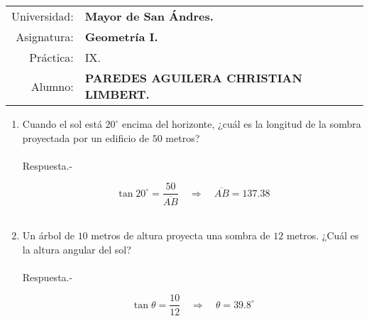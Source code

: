 \documentclass[10pt]{article}
\begin{document}
\begin{tabular}{r l }
Universidad: & \textbf{Mayor de San Ándres.}\\
Asignatura: & \textbf{Geometría I.}\\
 Práctica: & IX.\\ Alumno: & \textbf{PAREDES AGUILERA CHRISTIAN LIMBERT.}
\end{tabular}
\begin{flushleft}
\end{flushleft}


\begin{enumerate}

\section*{Funciones trigonométricas}

\item Cuando el sol está $20^\circ$ encima del horizonte, ¿cuál es la longitud de la sombra proyectada por un edificio de $50$ metros?\\\\
    Respuesta.-\; 
    \begin{center}
    \end{center}
	$$\tan 20^\circ = \dfrac{50}{\overline{AB}} \quad \Longrightarrow \quad \overline{AB} = 137.38$$\\

\item Un árbol de $10$ metros de altura proyecta una sombra de $12$ metros. ¿Cuál es la altura angular del sol?\\\\
    Respuesta.-\; 
    \begin{center}
    \end{center}
	$$\tan \theta = \dfrac{10}{12} \quad \Longrightarrow \quad \theta = 39.8^\circ$$\\


\end{enumerate}
\end{document}
